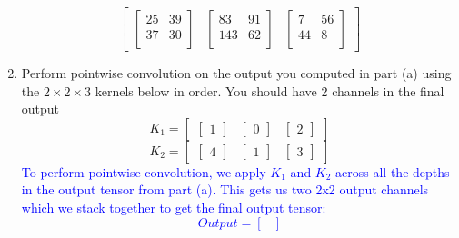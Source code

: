 \documentclass{article}
\begin{document}
\begin{enumerate}[label=(\alph*)]
{\[\begin{bmatrix}
            \begin{bmatrix}
                25 & 39  \\
                37 & 30 \\
            \end{bmatrix}
            &
            \begin{bmatrix}
                83 & 91  \\
                143 & 62 \\
            \end{bmatrix}
            &
            \begin{bmatrix}
                7 & 56  \\
                44 & 8 \\
            \end{bmatrix}
        \end{bmatrix}
    \]
    }
    \item Perform pointwise convolution on the output you computed in part (a) using the $2 \times 2 \times 3$ kernels below in order. You should have 2 channels in the final output
    \[K_1 = 
        \begin{bmatrix}
        \begin{bmatrix}
            1
        \end{bmatrix}
        &
        \begin{bmatrix}
            0
        \end{bmatrix}
        &
        \begin{bmatrix}
            2
        \end{bmatrix}
        \end{bmatrix}
    \]
    \[K_2 = 
        \begin{bmatrix}
        \begin{bmatrix}
            4
        \end{bmatrix} 
        &
        \begin{bmatrix}
            1
        \end{bmatrix}
        &
        \begin{bmatrix}
            3
        \end{bmatrix}
        \end{bmatrix}
    \]
    \textcolor{blue}{To perform pointwise convolution, we apply $K_1$ and $K_2$ across all the depths in the output tensor from part (a). This gets us two 2x2 output channels which we stack together to get the final output tensor: 
    \[Output = 
        \begin{bmatrix}

\end{bmatrix}\]}
\end{enumerate}
\end{document}
